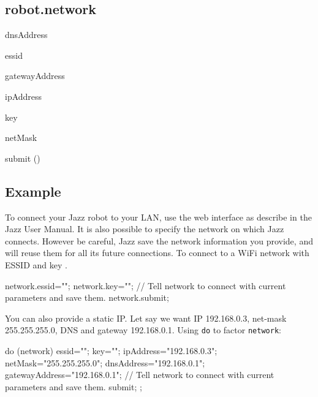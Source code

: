 \subsection{robot.network}

\begin{urbiscriptapi}
\item[dnsAddress]


\item[essid]


\item[gatewayAddress]


\item[ipAddress]


\item[key]


\item[netMask]


\item[submit]()
\end{urbiscriptapi}

\subsection{Example}

To connect your Jazz robot to your LAN, use the web interface as describe in
the Jazz User Manual. It is also possible to specify the network on which
Jazz connects. However be careful, Jazz save the network information you
provide, and will reuse them for all its future connections.  To connect to
a WiFi network with ESSID  and key .

\begin{urbiunchecked}[style=varInString]
network.essid="";
network.key="";
// Tell network to connect with current parameters and save them.
network.submit;
\end{urbiunchecked}

You can also provide a static IP. Let say we want IP 192.168.0.3,
net-mask 255.255.255.0, DNS and gateway 192.168.0.1.  Using \lstinline{do}
to factor \lstinline{network}:

\begin{urbiunchecked}[style=varInString]
do (network)
{
  essid="";
  key="";
  ipAddress="192.168.0.3";
  netMask="255.255.255.0";
  dnsAddress="192.168.0.1";
  gatewayAddress="192.168.0.1";
  // Tell network to connect with current parameters and save them.
  submit;
};
\end{urbiunchecked}

